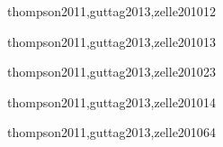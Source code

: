\begin{syllabus}
\begin{unit}{\PLOverviewDef}{thompson2011,guttag2013,zelle2010}{1}{2}
   \begin{learningoutcomes}
      \item \PLOverviewObjONE
      \item \PLOverviewObjTWO
   \end{learningoutcomes}
\end{unit}

\begin{unit}{\PLDeclarationsAndTypesDef}{thompson2011,guttag2013,zelle2010}{1}{3}
    \begin{topics}%
	\item \PLDeclarationsAndTypesTopicThe%
	\item \PLDeclarationsAndTypesTopicOverview%
    \end{topics}%
    \PLDeclarationsAndTypesAllObjectives
\end{unit}

\begin{unit}{\PFFundamentalConstructsDef}{thompson2011,guttag2013,zelle2010}{2}{3}
  \PFFundamentalConstructsAllTopics
  \PFFundamentalConstructsAllObjectives
\end{unit}

\begin{unit}{\PLFunctionalProgrammingDef}{thompson2011,guttag2013,zelle2010}{1}{4}
    \begin{topics}%
	\item \PLFunctionalProgrammingTopicOverview%
	\item \PLFunctionalProgrammingTopicRecursion%
	\item \PLFunctionalProgrammingTopicPragmatics%
    \end{topics}%
   \PLFunctionalProgrammingAllObjectives
\end{unit}

\begin{unit}{\PFRecursionDef}{thompson2011,guttag2013,zelle2010}{6}{4}
    \begin{topics}%
	\item \PFRecursionTopicTheconcept%
	\item \PFRecursionTopicRecursive%
	\item \PFRecursionTopicSimple%
	\item \PFRecursionTopicDiveAndConquer%
    \end{topics}%

    \begin{learningoutcomes}%
	\item \PFRecursionObjONE%
	\item \PFRecursionObjTWO%
	\item \PFRecursionObjTHREE%
	\item \PFRecursionObjFOUR%
	\item \PFRecursionObjFIVE%
	\item \PFRecursionObjSIX%
	\item \PFRecursionObjEIGHT%
    \end{learningoutcomes}%
\end{unit}


\end{syllabus}
